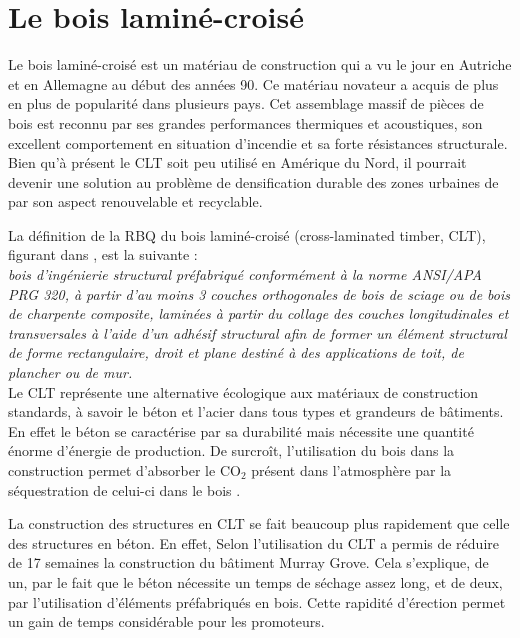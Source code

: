 \documentclass[11pt]{article}
\begin{document}
\section{Le bois laminé-croisé}

Le bois laminé-croisé est un matériau de construction qui a vu le jour en Autriche et en Allemagne au début des années 90. Ce matériau novateur a acquis de plus en plus de popularité dans plusieurs pays. Cet assemblage massif de pièces de bois est reconnu par ses grandes performances thermiques et acoustiques, son excellent comportement en situation d'incendie et sa forte résistances structurale. Bien qu'à présent le CLT soit peu utilisé en Amérique du Nord, il pourrait devenir une solution au problème de densification durable des zones urbaines de par son aspect renouvelable et recyclable.

La définition de la RBQ du bois laminé-croisé (cross-laminated timber, CLT), figurant dans \cite{RBQCLT}, est la suivante : 
\\

\textit{
bois d'ingénierie structural préfabriqué conformément à la norme ANSI/APA PRG 320, à partir d'au moins 3 couches orthogonales de bois de sciage ou de bois de charpente composite, laminées à partir du collage des couches longitudinales et transversales à l'aide d'un adhésif structural afin de former un élément structural de forme rectangulaire, droit et plane destiné à des applications de toit, de plancher ou de mur.}
\\

Le CLT représente une alternative écologique aux matériaux de construction standards, à savoir le béton et l'acier dans tous types et grandeurs de bâtiments. En effet le béton se caractérise par sa durabilité mais nécessite une quantité énorme d'énergie de production. De surcroît, l'utilisation du bois dans la construction permet d'absorber le $\text{CO}_2$ présent dans l'atmosphère par la séquestration de celui-ci dans le bois \cite{reference1}.

La construction des structures en CLT se fait beaucoup plus rapidement que celle des structures en béton. En effet, Selon \cite{ref7}  \cite{reference1} l'utilisation du CLT a permis de réduire de 17 semaines la construction du bâtiment Murray Grove. Cela s'explique, de un, par le fait que le béton nécessite un temps de séchage assez long, et de deux, par l'utilisation d'éléments préfabriqués en bois. Cette rapidité d'érection permet un gain de temps considérable pour les promoteurs.
\end{document}
